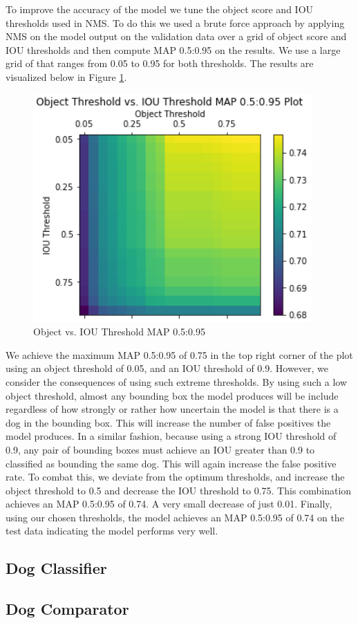 \documentclass{article}
\begin{document}
To improve the accuracy of the model we tune the object score and IOU thresholds used in NMS.  To do this we used a brute force approach by applying NMS on the model output on the validation data over a grid of object score and IOU thresholds and then compute MAP 0.5:0.95 on the results.  We use a large grid of that ranges from 0.05 to 0.95 for both thresholds.  The results are visualized below in Figure \ref{fig:x object v iou}.  

\begin{figure}[h]
\centering
	\includegraphics[scale=0.7]{final-report-images/map0.5to0.95.png}
\caption{Object vs. IOU Threshold MAP 0.5:0.95}
\label{fig:x object v iou}
\end{figure}

\noindent We achieve the maximum MAP 0.5:0.95 of 0.75 in the top right corner of the plot using an object threshold of 0.05, and an IOU threshold of 0.9.  However, we consider the consequences of using such extreme thresholds.  By using such a low object threshold, almost any bounding box the model produces will be include regardless of how strongly or rather how uncertain the model is that there is a dog in the bounding box.  This will increase the number of false positives the model produces.  In a similar fashion, because using a strong IOU threshold of 0.9, any pair of bounding boxes must achieve an IOU greater than 0.9 to classified as bounding the same dog.  This will again increase the false positive rate.  To combat this, we deviate from the optimum thresholds, and increase the object threshold to 0.5 and decrease the IOU threshold to 0.75.  This combination achieves an MAP 0.5:0.95 of 0.74.  A very small decrease of just 0.01.  Finally, using our chosen thresholds, the model achieves an MAP 0.5:0.95 of 0.74 on the test data indicating the model performs very well.



\subsection{Dog Classifier}

\subsection{Dog Comparator}


\newpage
\end{document}
